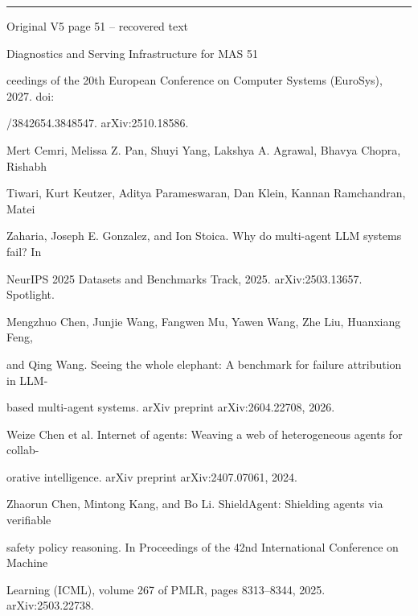 \par\smallskip\noindent\rule{\textwidth}{0.4pt}\par{\sffamily\footnotesize Original V5 page 51 -- recovered text}\par\begin{flushleft}\footnotesize\ttfamily
\par\smallskip
\par\smallskip
\noindent Diagnostics and Serving Infrastructure for MAS 51\par
\par\smallskip
\par\smallskip
\par\smallskip
\noindent  ceedings of the 20th European Conference on Computer Systems (EuroSys), 2027. doi:\par
{}/3842654.3848547. arXiv:2510.18586.\par
\noindent  [5] Mert Cemri, Melissa Z. Pan, Shuyi Yang, Lakshya A. Agrawal, Bhavya Chopra, Rishabh\par
\noindent  Tiwari, Kurt Keutzer, Aditya Parameswaran, Dan Klein, Kannan Ramchandran, Matei\par
\noindent  Zaharia, Joseph E. Gonzalez, and Ion Stoica. Why do multi-agent LLM systems fail? In\par
\noindent  NeurIPS 2025 Datasets and Benchmarks Track, 2025. arXiv:2503.13657. Spotlight.\par
\noindent  [6] Mengzhuo Chen, Junjie Wang, Fangwen Mu, Yawen Wang, Zhe Liu, Huanxiang Feng,\par
\noindent  and Qing Wang. Seeing the whole elephant: A benchmark for failure attribution in LLM-\par
\noindent  based multi-agent systems. arXiv preprint arXiv:2604.22708, 2026.\par
\noindent  [7] Weize Chen et al. Internet of agents: Weaving a web of heterogeneous agents for collab-\par
\noindent  orative intelligence. arXiv preprint arXiv:2407.07061, 2024.\par
\noindent  [8] Zhaorun Chen, Mintong Kang, and Bo Li. ShieldAgent: Shielding agents via verifiable\par
\noindent  safety policy reasoning. In Proceedings of the 42nd International Conference on Machine\par
\noindent  Learning (ICML), volume 267 of PMLR, pages 8313–8344, 2025. arXiv:2503.22738.\par

\end{flushleft}
